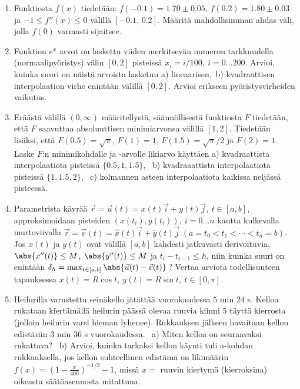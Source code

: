 \Harj
\begin{enumerate}

\item
Funktiosta $f(x)$ tiedetään: $f(-0.1)=1.70 \pm 0.05$, $f(0.2)=1.80 \pm 0.03$ ja
$-1 \le f''(x) \le 0$ välillä $[-0.1,\,0.2]$. Määritä mahdollisimman ahdas väli, jolla $f(0)$
varmasti sijaitsee.

\item
Funktion $e^x$ arvot on laskettu viiden merkitsevän numeron tarkkuudella (normaalipyöristys)
välin $[0,2]$ pisteissä $x_i=i/100,\ i=0 \ldots 200$. Arvioi, kuinka suuri on näistä
arvoista lasketun a) lineaarisen,\ b) kvadraattisen interpolaation virhe enintään välillä 
$[0,2]$. Arvioi erikseen pyöristysvirheiden vaikutus.

\item
Eräästä välillä $(0,\infty)$ määritellystä, säännöllisestä funktiosta $F$ tiedetään, että
$F$ saavuttaa absoluuttisen minimiarvonsa välillä $[1,2]$. Tiedetään lisäksi, että
$F(0.5)=\sqrt{\pi}$, $F(1)=1$, $F(1.5)=\sqrt{\pi}/2$ ja $F(2)=1$. Laske $F$:n minimikohdalle
ja -arvolle likiarvo käyttäen a) kvadraattista interpolaatiota pisteissä $\{0.5,1,1.5\}$, \
b) kvadraaattista interpolaatiota pisteissä $\{1,1.5,2\}$, \ c) kolmannen asteen 
interpolaatiota kaikissa neljässä pisteessä.

\item
Parametrista käyrää $\vec r=\vec u(t)=x(t)\vec i+y(t)\vec j,\ t\in[a,b]$, approksimoidaan
pisteiden $(x(t_i),y(t_i)),\ i=0 \ldots n$ kautta kulkevalla murtoviivalla
$\vec r = \vec v(t)=\hat{x}(t)\vec i+\hat{y}(t)\vec j\ (a=t_0 < t_1 < \cdots < t_n = b)$. 
Jos $x(t)$ ja $y(t)$ ovat välillä $[a,b]$ kahdesti jatkuvasti derivoituvia, 
$\abs{x''(t)} \le M$, $\abs{y''(t)} \le M$ ja $t_i-t_{i-1} \le h$, niin kuinka suuri on
enintään $\delta_h=\max_{t\in[a,b]}\abs{\vec u(t)-\vec v(t)}$\,? Vertaa arviota todellisuuteen 
tapauksessa $x(t)=R\cos t,\ y(t)=R\sin t,\ t\in[0,\pi]$.

\item
Heilurilla varustettu seinäkello jätättää vuorokaudessa $5$ min $24$ s. Kelloa rukataan 
kiertämällä heilurin päässä olevaa ruuvia kiinni $5$ täyttä kierrosta (jolloin heilurin varsi
hieman lyhenee). Rukkauksen jälkeen havaitaan kellon edistävän $3$ min $36$ s vuorokaudessa.
\ a) Miten kelloa on seuraavaksi rukattava? \ b) Arvioi, kuinka tarkaksi kellon käynti tuli
a-kohdan rukkauksella, jos kellon suhteellinen edistämä on likimäärin
$f(x)=(1-\frac{x}{400})^{-1/2}-1$, missä $x=$ ruuvin kiertymä (kierroksina) oikeasta 
säätöasennosta mitattuna.


\end{enumerate}
